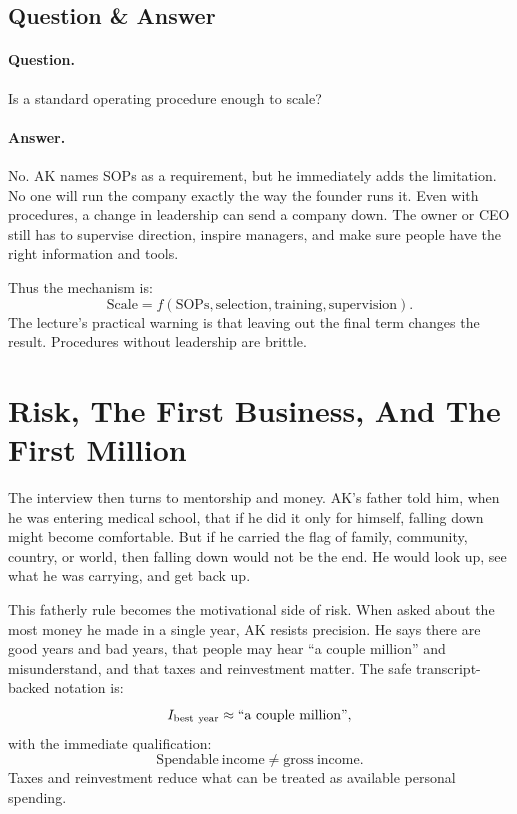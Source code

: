 \subsection{Question \& Answer}

\paragraph{Question.}
Is a standard operating procedure enough to scale?

\paragraph{Answer.}
No. AK names SOPs as a requirement, but he immediately adds the limitation. No one will run the company exactly the way the founder runs it. Even with procedures, a change in leadership can send a company down. The owner or CEO still has to supervise direction, inspire managers, and make sure people have the right information and tools.

Thus the mechanism is:
\begin{equation}
\mathrm{Scale}
=
f(\mathrm{SOPs},\mathrm{selection},\mathrm{training},\mathrm{supervision}).
\end{equation}
The lecture's practical warning is that leaving out the final term changes the result. Procedures without leadership are brittle.

\section{Risk, The First Business, And The First Million}

The interview then turns to mentorship and money. AK's father told him, when he was entering medical school, that if he did it only for himself, falling down might become comfortable. But if he carried the flag of family, community, country, or world, then falling down would not be the end. He would look up, see what he was carrying, and get back up.

This fatherly rule becomes the motivational side of risk. When asked about the most money he made in a single year, AK resists precision. He says there are good years and bad years, that people may hear ``a couple million'' and misunderstand, and that taxes and reinvestment matter. The safe transcript-backed notation is:
\begin{equation}
I_{\mathrm{best\ year}} \approx \hbox{``a couple million''},
\end{equation}
with the immediate qualification:
\begin{equation}
\mathrm{Spendable\ income} \neq \mathrm{gross\ income}.
\end{equation}
Taxes and reinvestment reduce what can be treated as available personal spending.

